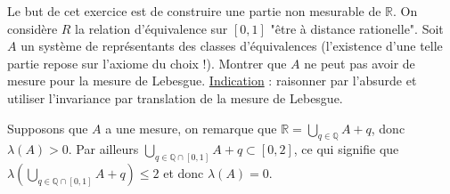 \documentclass[11pt,answers]{exam}
\begin{document}
\begin{questions}
\question
Le but de cet exercice est de construire une partie non mesurable de $\mathbb R$. On considère $R$ la relation d'équivalence sur $[0,1]$ "être à distance rationelle". Soit $A$ un système de représentants des classes d'équivalences (l'existence d'une telle partie repose sur l'axiome du choix !). Montrer que $A$ ne peut pas avoir de mesure pour la mesure de Lebesgue. \underline{Indication} : raisonner par l'absurde et utiliser l'invariance par translation de la mesure de Lebesgue.
\begin{solution}
Supposons que $A$ a une mesure, on remarque que $\mathbb R = \bigcup_{q\in \mathbb Q} A+q$, donc $\lambda(A)>0$. Par ailleurs $\bigcup_{q\in \mathbb Q \cap [0,1]} A+q \subset [0,2]$, ce qui signifie que $\lambda (\bigcup_{q\in \mathbb Q \cap [0,1]} A+q) \leq 2$ et donc $\lambda(A)=0$.
\end{solution}
\end{questions}

%
\end{document}
